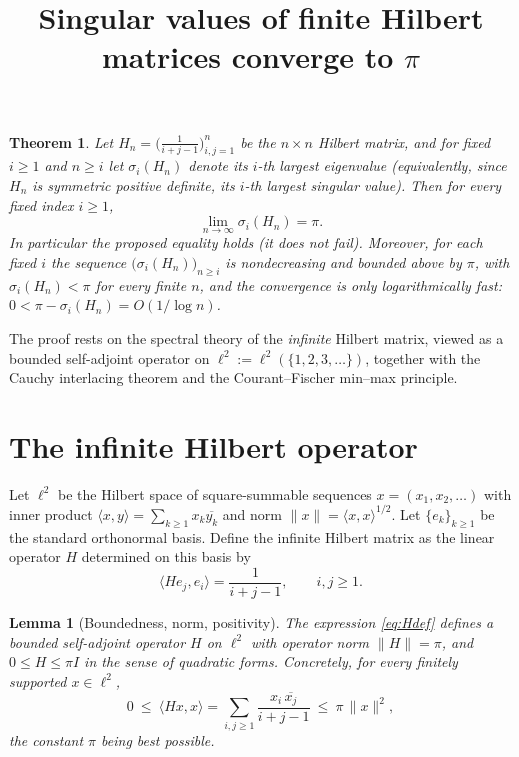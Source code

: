 \documentclass[12pt]{article}
\newtheorem{theorem}{Theorem}
\newtheorem{lemma}{Lemma}
\theoremstyle{remark}
\begin{document}
\title{Singular values of finite Hilbert matrices converge to $\pi$}
\author{}
\date{}
\maketitle

\begin{theorem}\label{thm:main}
Let $H_n=\bigl(\tfrac{1}{i+j-1}\bigr)_{i,j=1}^{n}$ be the $n\times n$ Hilbert matrix, and for
fixed $i\ge 1$ and $n\ge i$ let $\sigma_i(H_n)$ denote its $i$-th largest eigenvalue
(equivalently, since $H_n$ is symmetric positive definite, its $i$-th largest singular value).
Then for \emph{every} fixed index $i\ge 1$,
\[
\lim_{n\to\infty}\sigma_i(H_n)=\pi .
\]
In particular the proposed equality \emph{holds} (it does not fail).
Moreover, for each fixed $i$ the sequence $\bigl(\sigma_i(H_n)\bigr)_{n\ge i}$ is nondecreasing
and bounded above by $\pi$, with $\sigma_i(H_n)<\pi$ for every finite $n$, and the convergence is
only logarithmically fast: $0<\pi-\sigma_i(H_n)=O\!\left(1/\log n\right)$.
\end{theorem}

The proof rests on the spectral theory of the \emph{infinite} Hilbert matrix, viewed as a
bounded self-adjoint operator on $\ell^2:=\ell^2(\{1,2,3,\dots\})$, together with the
Cauchy interlacing theorem and the Courant--Fischer min--max principle.

\section{The infinite Hilbert operator}

Let $\ell^2$ be the Hilbert space of square-summable sequences
$x=(x_1,x_2,\dots)$ with inner product $\langle x,y\rangle=\sum_{k\ge1}x_k\overline{y_k}$ and
norm $\|x\|=\langle x,x\rangle^{1/2}$. Let $\{e_k\}_{k\ge1}$ be the standard orthonormal basis.
Define the infinite Hilbert matrix as the linear operator $H$ determined on this basis by
\begin{equation}\label{eq:Hdef}
\langle He_j,e_i\rangle=\frac{1}{i+j-1},\qquad i,j\ge1 .
\end{equation}

\begin{lemma}[Boundedness, norm, positivity]\label{lem:bounded}
The expression \eqref{eq:Hdef} defines a bounded self-adjoint operator $H$ on $\ell^2$ with
operator norm $\|H\|=\pi$, and $0\le H\le \pi I$ in the sense of quadratic forms. Concretely, for
every finitely supported $x\in\ell^2$,
\begin{equation}\label{eq:hilbertineq}
0\ \le\ \langle Hx,x\rangle=\sum_{i,j\ge1}\frac{x_i\,\overline{x_j}}{i+j-1}\ \le\ \pi\,\|x\|^2 ,
\end{equation}
the constant $\pi$ being best possible.
\end{lemma}
\end{document}
